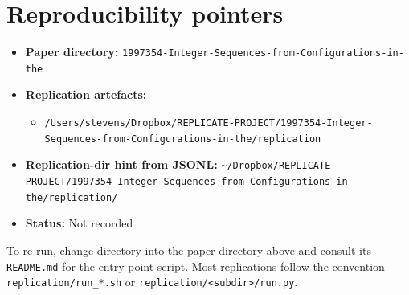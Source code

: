 \documentclass[11pt]{article}
\begin{document}
\section{Reproducibility pointers}\label{sec:repro}
\begin{itemize}
\item \textbf{Paper directory:} \texttt{1997354-Integer-Sequences-from-Configurations-in-the}
\item \textbf{Replication artefacts:}
\begin{itemize}
\item \texttt{/Users/stevens/Dropbox/REPLICATE-PROJECT/1997354-Integer-Sequences-from-Configurations-in-the/replication}
\end{itemize}
\item \textbf{Replication-dir hint from JSONL:} \texttt{\textasciitilde{}/Dropbox/REPLICATE-PROJECT/1997354-Integer-Sequences-from-Configurations-in-the/replication/}
\item \textbf{Status:} Not recorded
\end{itemize}

To re-run, change directory into the paper directory above and consult its \texttt{README.md} for the entry-point script. Most replications follow the convention \texttt{replication/run\_*.sh} or \texttt{replication/<subdir>/run.py}.
\end{document}
